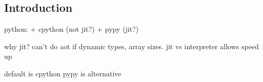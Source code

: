 
\subsection{Introduction}

python:
+ cpython (not jit?)
+ pypy (jit?)

why jit? can't do aot if dynamic types, array sizes.
jit vs interpreter allows speed up


default is cpython
pypy is alternative
